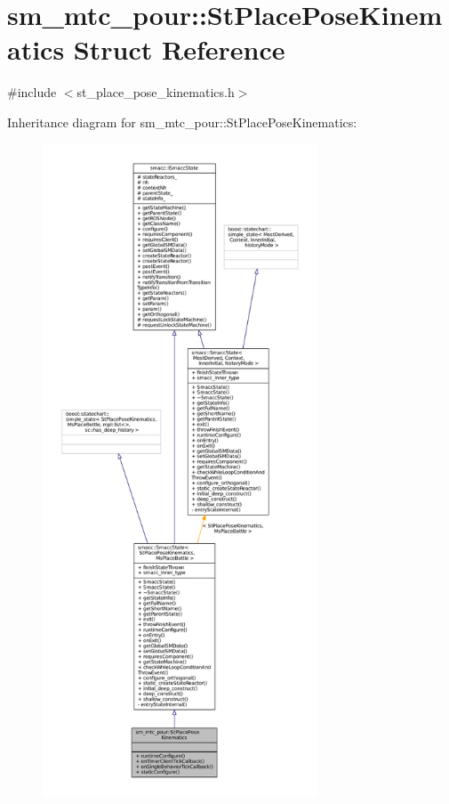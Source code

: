 \hypertarget{structsm__mtc__pour_1_1StPlacePoseKinematics}{}\section{sm\+\_\+mtc\+\_\+pour\+:\+:St\+Place\+Pose\+Kinematics Struct Reference}
\label{structsm__mtc__pour_1_1StPlacePoseKinematics}


{\ttfamily \#include $<$st\+\_\+place\+\_\+pose\+\_\+kinematics.\+h$>$}



Inheritance diagram for sm\+\_\+mtc\+\_\+pour\+:\+:St\+Place\+Pose\+Kinematics\+:
\nopagebreak
\begin{figure}[H]
\begin{center}
\leavevmode
\includegraphics[height=550pt]{structsm__mtc__pour_1_1StPlacePoseKinematics__inherit__graph}
\end{center}
\end{figure}


